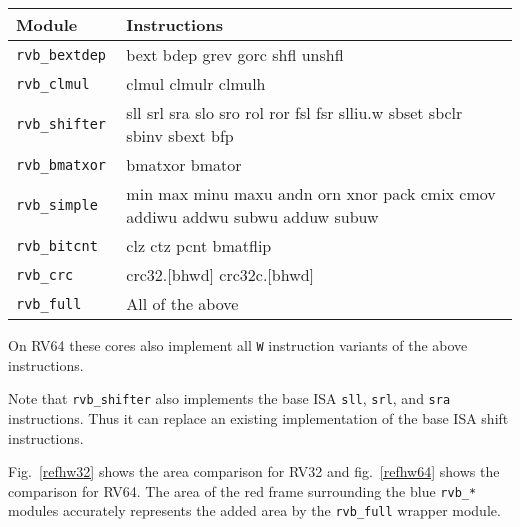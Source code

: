 \begin{center}
\begin{tabular}{lp{6cm}}
Module & Instructions \\
\hline
\tt rvb\_bextdep  & bext bdep grev gorc shfl unshfl                                               \\
\tt rvb\_clmul    & clmul clmulr clmulh                                                           \\
\tt rvb\_shifter  & sll srl sra slo sro rol ror fsl fsr slliu.w sbset sbclr sbinv sbext bfp       \\
\tt rvb\_bmatxor  & bmatxor bmator                                                                \\
\tt rvb\_simple   & min max minu maxu andn orn xnor pack cmix cmov addiwu addwu subwu adduw subuw \\
\tt rvb\_bitcnt   & clz ctz pcnt bmatflip                                                         \\
\tt rvb\_crc      & crc32.[bhwd] crc32c.[bhwd]                                                    \\
\tt rvb\_full     & All of the above                                                              \\
\end{tabular}
\end{center}

On RV64 these cores also implement all {\tt *W} instruction variants of the above instructions.

Note that {\tt rvb\_shifter} also implements the base ISA {\tt sll}, {\tt srl},
and {\tt sra} instructions. Thus it can replace an existing implementation of
the base ISA shift instructions.

Fig.~\ref{refhw32} shows the area comparison for RV32 and fig.~\ref{refhw64} shows the comparison for RV64.
The area of the red frame surrounding the blue {\tt rvb\_*} modules accurately represents the added area
by the {\tt rvb\_full} wrapper module.

